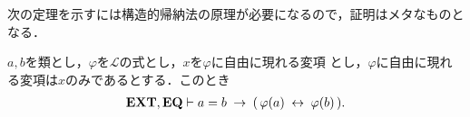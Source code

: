 	次の定理を示すには構造的帰納法の原理が必要になるので，証明はメタなものとなる．
	
	\begin{screen}
		\begin{thm}[代入定理]\label{thm:substitution_principle}
			$a,b$を類とし，$\varphi$を$\mathcal{L}$の式とし，$x$を$\varphi$に自由に現れる変項
			とし，$\varphi$に自由に現れる変項は$x$のみであるとする．このとき
			\begin{align}
				\mbox{{\bf EXT}},\mbox{{\bf EQ}} \vdash a = b \hspace{0.25em}\rightarrow\hspace{0.25em} 
				(\, \varphi(a) \hspace{0.25em}\leftrightarrow\hspace{0.25em} \varphi(b)\, ).
			\end{align}
		\end{thm}
	\end{screen}